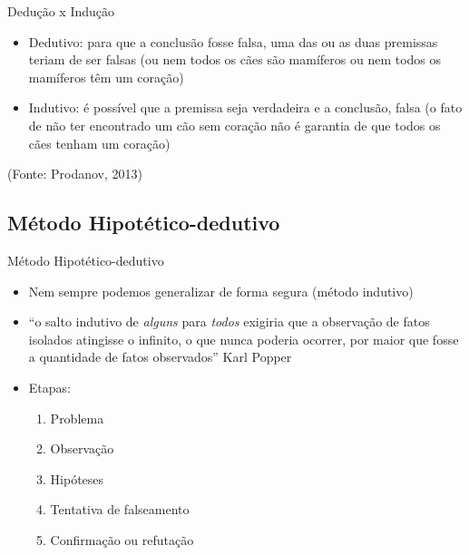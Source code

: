 \documentclass{beamer}
\begin{document}
\begin{frame}{Dedução x Indução}
  \begin{itemize}
  \item Dedutivo: para que a conclusão fosse falsa, uma das ou as duas
    premissas teriam de ser falsas (ou nem todos os cães são mamíferos
    ou nem todos os mamíferos têm um coração)
  \item Indutivo: é possível que a premissa seja verdadeira e a
    conclusão, falsa (o fato de não ter encontrado um cão sem coração
    não é garantia de que todos os cães tenham um coração)
  \end{itemize}

\vfill
(Fonte: Prodanov, 2013)
\end{frame}

\subsection{Método Hipotético-dedutivo}

\begin{frame}{Método Hipotético-dedutivo}
  \begin{itemize}
  \item Nem sempre podemos generalizar de forma segura (método
    indutivo)
  \item ``o salto indutivo de {\em alguns} para {\em todos} exigiria
    que a observação de fatos isolados atingisse o infinito, o que
    nunca poderia ocorrer, por maior que fosse a quantidade de fatos
    observados'' Karl Popper
  \item Etapas:
    \begin{enumerate}
    \item Problema
    \item Observação
    \item Hipóteses
    \item Tentativa de falseamento
    \item Confirmação ou refutação
    \end{enumerate}
  \end{itemize}
\end{frame}
\end{document}
